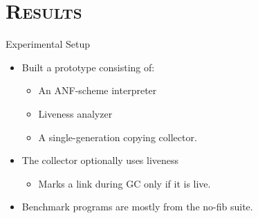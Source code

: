 \section{\scshape Results}
\begin{frame}{Experimental Setup}
  \begin{itemize}\itemsep1em
  \item Built a prototype consisting of:
    \begin{itemize}
    \item An ANF-scheme interpreter
    \item Liveness analyzer
    \item A single-generation copying collector.
     \end{itemize}
  \item The collector optionally uses liveness
    \begin{itemize}
    \item Marks a link during GC only if it is live.
    \end{itemize}
  \item Benchmark programs are mostly from the no-fib suite. 
  \end{itemize}

\end{frame}

